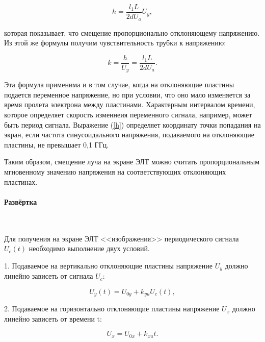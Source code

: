 \documentclass[a4paper,12pt]{report}
\begin{document}
{	\begin{equation}
	h=\frac{l_1L}{2dU_a} U_y , \label{h}
	\end{equation}
	
	\text\par{которая показывает, что смещение пропорционально отклоняющему напряжению. Из этой же формулы получим чувствительность трубки к напряжению:}
	
	\begin{equation}
	k=\frac{h}{U_y}=\frac{l_1L}{2dU_a} . \label{k}
	\end{equation}

	 \text\par{Эта формула применима и в том случае, когда на отклоняющие пластины подается переменное напряжение, но при условии, что оно мало изменяется за время пролета электрона между пластинами. Характерным интервалом времени, которое определяет скорость изменнеия переменного сигнала, например, может быть период сигнала. Выражение (\ref{h}) определяет координату точки попадания на экран, если частота синусоидального напряжения, подаваемого на отклоняющие пластины, не превышает 0,1 ГГц.}
	 \\	 
	 \text\par{	 Таким образом, смещение луча на экране ЭЛТ можно считать пропорциональным мгновенному значению напряжения на соответствующих отклоняющих пластинах.}
	 
	\paragraph{\Large Развёртка } \text{ }
	\\
	\text\par{	Для получения на экране ЭЛТ <<изображения>> периодического сигнала $U_c(t)$ необходимо выполнение двух условий.}
	\\
	\text\par{ {   } 1. Подаваемое на вертикально отклоняющие пластины напряжение $U_y$ должно линейно зависеть от сигнала $U_c$:}
	
	\begin{equation}		
	U_y(t)=U_{0y}+k_{yu}U_c(t), \label{uy}
	\end{equation}
	
	\text\par{2. Подаваемое на горизонтально отклоняющие пластины напряжение $U_x$ должно линейно зависеть от времени t:}
	
	\begin{equation}
	U_x=U_{0x}+k_{xu}t. \label{ux}
	\end{equation}
	
}
\end{document}
